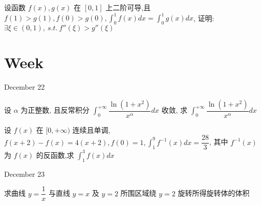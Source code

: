 \begin{solution}
	
\end{solution}

\begin{example}[][Exam: 38.3.14]
	设函数 $f(x),g(x)$ 在 $[0,1]$ 上二阶可导,且 $f(1)>g(1),f(0)>g(0), \displaystyle{\int_{0}^{1}f(x)dx=\int_{0}^{1}g(x)dx}$, 证明: 
	$\exists \xi\in(0,1),\ s.t.\ f''(\xi)>g''(\xi)$
\end{example}

\begin{solution}
	
\end{solution}


\section{Week }
\textcolor{purplea}{December 22}

\begin{example}[][Exam: 38.4.1]
	设 $\alpha$ 为正整数, 且反常积分 $\displaystyle{\int_{0}^{+\infty}\dfrac{\ln(1+x^{2})}{x^{\alpha}}dx}$ 收敛,
	求 $\displaystyle{\int_{0}^{+\infty}\dfrac{\ln(1+x^{2})}{x^{\alpha}}dx}$
\end{example}

\begin{solution}
	
\end{solution}

\begin{example}[][Exam: 38.4.2]
	设 $f(x)$ 在 $[0,+\infty)$ 连续且单调,$f(x+2)-f(x)=4(x+2),f(0)=1, \displaystyle{\int_{1}^{9}f^{-1}(x)dx=\dfrac{28}{3}}$,
	其中 $f^{-1}(x)$ 为 $f(x)$ 的反函数,求 $\displaystyle{\int_{1}^{3}f(x)dx}$
\end{example}

\begin{solution}
	
\end{solution}


\textcolor{purplea}{December 23}

\begin{example}[][Exam: 38.4.3]
	求曲线 $y=\dfrac{1}{x}$ 与直线 $y=x$ 及 $y=2$ 所围区域绕 $y=2$ 旋转所得旋转体的体积
\end{example}

\begin{solution}
	
\end{solution}

